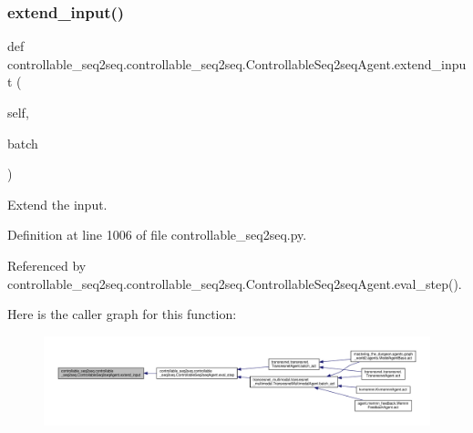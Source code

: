 \subsubsection{\texorpdfstring{extend\+\_\+input()}{extend\_input()}}
{\footnotesize\ttfamily def controllable\+\_\+seq2seq.\+controllable\+\_\+seq2seq.\+Controllable\+Seq2seq\+Agent.\+extend\+\_\+input (\begin{DoxyParamCaption}\item[{}]{self,  }\item[{}]{batch }\end{DoxyParamCaption})}

\begin{DoxyVerb}Extend the input.\end{DoxyVerb}
 

Definition at line 1006 of file controllable\+\_\+seq2seq.\+py.



Referenced by controllable\+\_\+seq2seq.\+controllable\+\_\+seq2seq.\+Controllable\+Seq2seq\+Agent.\+eval\+\_\+step().

Here is the caller graph for this function\+:
\nopagebreak
\begin{figure}[H]
\begin{center}
\leavevmode
\includegraphics[width=350pt]{classcontrollable__seq2seq_1_1controllable__seq2seq_1_1ControllableSeq2seqAgent_ade83148e3cf61ac4c5149206000584c5_icgraph}
\end{center}
\end{figure}
\mbox{\label{classcontrollable__seq2seq_1_1controllable__seq2seq_1_1ControllableSeq2seqAgent_a5cbdb2b3630855612a695f82880b763b}} 
